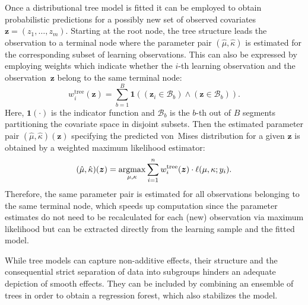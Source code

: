 \documentclass[nojss,shortnames]{jss}
\newcommand{\argmax}{\operatorname{argmax}\displaylimits}
\numberwithin{equation}{section}
\begin{document}
Once a distributional tree model is fitted it can be employed to obtain
probabilistic predictions for a possibly new set of observed covariates $\bm{z}
= (z_1, \ldots, z_m)$. Starting at the root node, the tree structure leads the
observation to a terminal node where the parameter pair $(\hat{\mu},
\hat{\kappa})$ is estimated for the corresponding subset of learning
observations. This can also be expressed by employing weights which indicate
whether the $i$-th learning observation and the observation~$\bm{z}$ belong to
the same terminal node: 
\begin{equation}
  w^{\text{tree}}_i(\bm{z}) = \sum_{b=1}^B \mathbf{1}((\bm{z}_i \in
  \mathcal{B}_b) \land (\bm{z} \in \mathcal{B}_b)).
\end{equation} 
Here, $\mathbf{1}(\cdot)$ is the indicator function and $\mathcal{B}_b$ is the
$b$-th out of $B$ segments partitioning the covariate space in disjoint
subsets. Then the estimated parameter pair $(\hat{\mu},\hat{\kappa})(\bm{z})$
specifying the predicted von~Mises distribution for a given $\bm{z}$ is
obtained by a weighted maximum likelihood estimator:
\begin{equation} 
  (\hat{\mu},\hat{\kappa})(\bm{z}) =
  \argmax_{\mu,\kappa} \sum_{i=1}^n w^{\text{tree}}_i(\bm{z}) \cdot
  \ell(\mu,\kappa; y_i).
\end{equation}
Therefore, the same parameter pair is estimated for all observations belonging
to the same terminal node, which speeds up computation since the parameter
estimates do not need to be recalculated for each (new) observation via maximum
likelihood but can be extracted directly from the learning sample and the
fitted model.

While tree models can capture non-additive effects, their structure and the
consequential strict separation of data into subgroups hinders an adequate
depiction of smooth effects. They can be included by combining an ensemble of
trees in order to obtain a regression forest, which also stabilizes the model. 
\end{document}
